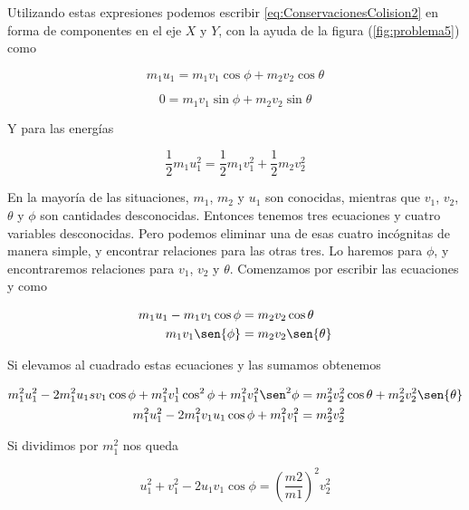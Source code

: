\documentclass[a4paper,10pt]{article}
\numberwithin{equation}{section}
\begin{document}
Utilizando estas expresiones podemos escribir \ref{eq:ConservacionesColision2} en forma de componentes
en el eje $X$ y $Y$, con la ayuda de la figura (\ref{fig:problema5}) como

\begin{equation}
%
m_1 u_1 = m_1 v_1 \cos{\phi} + m_2 v_2 \cos{\theta}
\label{eq:momentaAngulos1}
\end{equation}

\begin{equation}
0 = m_1 v_1 \sin{\phi} + m_2 v_2 \sin{\theta} 
\label{eq:momentaAngulos2}
\end{equation}

Y para las energías

\begin{equation}
 \frac{1}{2}m_1 u_1^2 = \frac{1}{2} m_1 v_1^2 + \frac{1}{2} m_2 v_2^2
 \label{eq:cineticas1}
\end{equation}

En la mayoría de las situaciones, $m_1$, $m_2$ y $u_1$ son conocidas, mientras que
$v_1$, $v_2$, $\theta$ y $\phi$ son cantidades desconocidas. Entonces tenemos tres
ecuaciones  y cuatro variables desconocidas. Pero
podemos eliminar una de esas cuatro incógnitas de manera simple, y encontrar relaciones
para las otras tres. Lo haremos para $\phi$, y encontraremos relaciones para $v_1$, 
$v_2$ y $\theta$. Comenzamos por escribir las ecuaciones  y
 como

\begin{align*}
 m_1 u_1 - m_1 v_1 \cos{\phi} &= m_2 v_2 \cos{\theta} \\
 m_1 v_1 \sen{\phi} &= m_2 v_2 \sen{\theta}
\end{align*}

Si elevamos al cuadrado estas ecuaciones y las sumamos obtenemos

\begin{align}
\begin{split}
  m_1^2 u_1^2 - 2 m_1^2 u_1 sv_1 \cos{\phi} + m_1^2 v_1^1 \cos^2{\phi} + m_1^2 v_1^2 \sen^2{\phi}
  &= m_2^2 v_2^2 \cos{\theta} + m_2^2 v_2^2 \sen{\theta} \\
  m_1^2 u_1^2 - 2 m_1^2 v_1 u_1 \cos{\phi} + m_1^2 v_1^2 &= m_2^2 v_2^2 
\end{split}
\end{align}

Si dividimos por $m_1^2$ nos queda

\begin{equation}
 u_1^2 + v_1^2 - 2 u_1 v_1 \cos{\phi} = \left(\frac{m2}{m1} \right)^2 v_2^2 
 \label{eq:velocidadesCoseno}
\end{equation}
\end{document}
